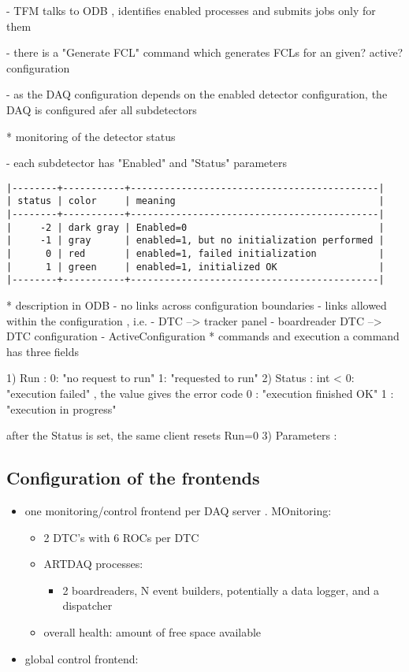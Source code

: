   - TFM talks to ODB , identifies enabled processes and submits jobs only
    for them

  - there is a "Generate FCL" command which generates FCLs
    for an given? active? configuration

- as the DAQ configuration depends on the enabled detector configuration,
  the DAQ is configured afer all subdetectors 


* monitoring of the detector status                                          

- each subdetector has "Enabled" and "Status" parameters
\begin{verbatim}
|--------+-----------+--------------------------------------------|
| status | color     | meaning                                    |
|--------+-----------+--------------------------------------------|
|     -2 | dark gray | Enabled=0                                  |
|     -1 | gray      | enabled=1, but no initialization performed |
|      0 | red       | enabled=1, failed initialization           |
|      1 | green     | enabled=1, initialized OK                  |
|--------+-----------+--------------------------------------------|
\end{verbatim}

* description in ODB                                                         
- no links across configuration boundaries
- links allowed within the configuration , i.e.
  - DTC --> tracker panel
  - boardreader DTC --> DTC configuration
- ActiveConfiguration
* commands and execution
 a command has three fields
 
1) Run     : 0: "no request to run"  1: "requested to run" 
2) Status  : int
   < 0: "execution failed" , the value gives the error code
   0  : "execution finished OK"
   1  : "execution in progress"

   after the Status is set, the same client resets Run=0
3) Parameters :


\subsection{Configuration of the frontends}

\begin{itemize}
\item
  one monitoring/control frontend per DAQ server . MOnitoring:
  \begin{itemize}
  \item
    2 DTC's with 6 ROCs per DTC
  \item
    ARTDAQ processes:
    \begin{itemize}
    \item
      2 boardreaders, N event builders, potentially a data logger, and a dispatcher
    \end{itemize}
  \item
    overall health: amount of free space available
  \end{itemize}
\item
  global control frontend:
\end{itemize}
